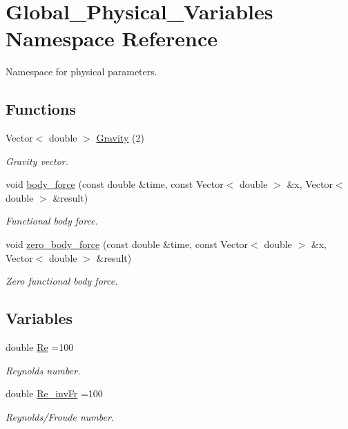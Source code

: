 \hypertarget{namespaceGlobal__Physical__Variables}{}\section{Global\+\_\+\+Physical\+\_\+\+Variables Namespace Reference}
\label{namespaceGlobal__Physical__Variables}


Namespace for physical parameters.  


\subsection*{Functions}
\begin{DoxyCompactItemize}
\item 
Vector$<$ double $>$ \hyperlink{namespaceGlobal__Physical__Variables_afae321364975eb56688ad13abc8ed6b7}{Gravity} (2)
\begin{DoxyCompactList}\small\item\em Gravity vector. \end{DoxyCompactList}\item 
void \hyperlink{namespaceGlobal__Physical__Variables_a87da705b8a46bed337cf5dbdd788b87b}{body\+\_\+force} (const double \&time, const Vector$<$ double $>$ \&x, Vector$<$ double $>$ \&result)
\begin{DoxyCompactList}\small\item\em Functional body force. \end{DoxyCompactList}\item 
void \hyperlink{namespaceGlobal__Physical__Variables_a9780d615ae07c4e00a436ab2973b54e6}{zero\+\_\+body\+\_\+force} (const double \&time, const Vector$<$ double $>$ \&x, Vector$<$ double $>$ \&result)
\begin{DoxyCompactList}\small\item\em Zero functional body force. \end{DoxyCompactList}\end{DoxyCompactItemize}
\subsection*{Variables}
\begin{DoxyCompactItemize}
\item 
double \hyperlink{namespaceGlobal__Physical__Variables_ab814e627d2eb5bc50318879d19ab16b9}{Re} =100
\begin{DoxyCompactList}\small\item\em Reynolds number. \end{DoxyCompactList}\item 
double \hyperlink{namespaceGlobal__Physical__Variables_ab1a845a672b4d74b304639a976dc65c6}{Re\+\_\+inv\+Fr} =100
\begin{DoxyCompactList}\small\item\em Reynolds/\+Froude number. \end{DoxyCompactList}\end{DoxyCompactItemize}


